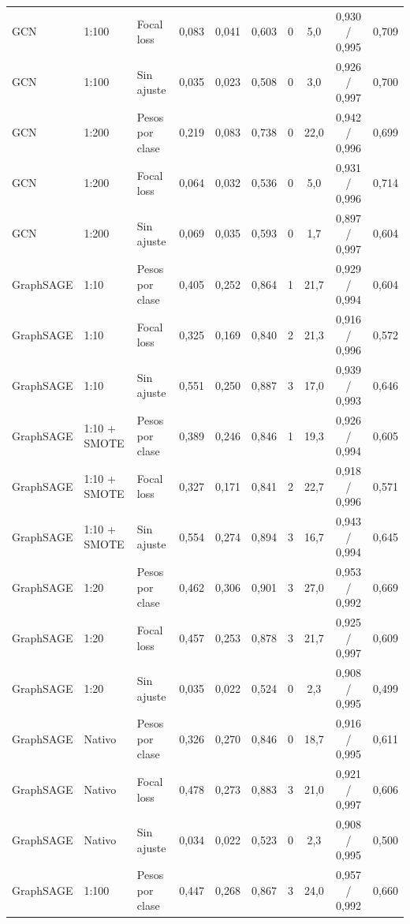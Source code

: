\begin{longtable}{lllccccccc}
GCN & 1:100 & Focal loss & 0{,}083 & 0{,}041 & 0{,}603 & 0 & 5{,}0 & 0{,}930 / 0{,}995 & 0{,}709 \\
GCN & 1:100 & Sin ajuste & 0{,}035 & 0{,}023 & 0{,}508 & 0 & 3{,}0 & 0{,}926 / 0{,}997 & 0{,}700 \\
GCN & 1:200 & Pesos por clase & 0{,}219 & 0{,}083 & 0{,}738 & 0 & 22{,}0 & 0{,}942 / 0{,}996 & 0{,}699 \\
GCN & 1:200 & Focal loss & 0{,}064 & 0{,}032 & 0{,}536 & 0 & 5{,}0 & 0{,}931 / 0{,}996 & 0{,}714 \\
GCN & 1:200 & Sin ajuste & 0{,}069 & 0{,}035 & 0{,}593 & 0 & 1{,}7 & 0{,}897 / 0{,}997 & 0{,}604 \\
\midrule
GraphSAGE & 1:10 & Pesos por clase & 0{,}405 & 0{,}252 & 0{,}864 & 1 & 21{,}7 & 0{,}929 / 0{,}994 & 0{,}604 \\
GraphSAGE & 1:10 & Focal loss & 0{,}325 & 0{,}169 & 0{,}840 & 2 & 21{,}3 & 0{,}916 / 0{,}996 & 0{,}572 \\
GraphSAGE & 1:10 & Sin ajuste & 0{,}551 & 0{,}250 & 0{,}887 & 3 & 17{,}0 & 0{,}939 / 0{,}993 & 0{,}646 \\
GraphSAGE & 1:10 + SMOTE & Pesos por clase & 0{,}389 & 0{,}246 & 0{,}846 & 1 & 19{,}3 & 0{,}926 / 0{,}994 & 0{,}605 \\
GraphSAGE & 1:10 + SMOTE & Focal loss & 0{,}327 & 0{,}171 & 0{,}841 & 2 & 22{,}7 & 0{,}918 / 0{,}996 & 0{,}571 \\
GraphSAGE & 1:10 + SMOTE & Sin ajuste & 0{,}554 & 0{,}274 & 0{,}894 & 3 & 16{,}7 & 0{,}943 / 0{,}994 & 0{,}645 \\
GraphSAGE & 1:20 & Pesos por clase & 0{,}462 & 0{,}306 & 0{,}901 & 3 & 27{,}0 & 0{,}953 / 0{,}992 & 0{,}669 \\
GraphSAGE & 1:20 & Focal loss & 0{,}457 & 0{,}253 & 0{,}878 & 3 & 21{,}7 & 0{,}925 / 0{,}997 & 0{,}609 \\
GraphSAGE & 1:20 & Sin ajuste & 0{,}035 & 0{,}022 & 0{,}524 & 0 & 2{,}3 & 0{,}908 / 0{,}995 & 0{,}499 \\
GraphSAGE & Nativo & Pesos por clase & 0{,}326 & 0{,}270 & 0{,}846 & 0 & 18{,}7 & 0{,}916 / 0{,}995 & 0{,}611 \\
GraphSAGE & Nativo & Focal loss & 0{,}478 & 0{,}273 & 0{,}883 & 3 & 21{,}0 & 0{,}921 / 0{,}997 & 0{,}606 \\
GraphSAGE & Nativo & Sin ajuste & 0{,}034 & 0{,}022 & 0{,}523 & 0 & 2{,}3 & 0{,}908 / 0{,}995 & 0{,}500 \\
GraphSAGE & 1:100 & Pesos por clase & 0{,}447 & 0{,}268 & 0{,}867 & 3 & 24{,}0 & 0{,}957 / 0{,}992 & 0{,}660 \\

\end{longtable}

